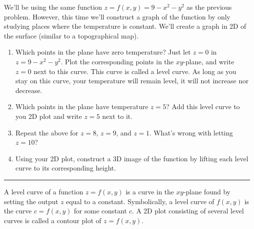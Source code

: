 \begin{problem}\label{cake level curves plot}%
%
 We'll be using the same function $z=f(x,y)=9-x^2-y^2$ as the previous problem.  However, this time we'll construct a graph of the function by only studying places where the temperature is constant.  We'll create a graph in 2D of the surface (similar to a topographical map). 
 \begin{enumerate}
  \item%
%
Which points in the plane have zero temperature? Just let $z=0$ in $z=9-x^2-y^2$. Plot the corresponding points in the $xy$-plane, and write $z=0$ next to this curve. This curve is called a level curve. As long as you stay on this curve, your temperature will remain level, it will not increase nor decrease. 
  \item Which points in the plane have temperature $z=5$?  Add this level curve to you 2D plot and write $z=5$ next to it.
  \item Repeat the above for $z=8$, $z=9$, and $z=1$. What's wrong with letting $z=10$? 
  \item Using your 2D plot, construct a 3D image of the function by lifting each level curve to its corresponding height.
 \end{enumerate}
\hrule\end{problem}

\begin{definition}
 A level curve of a function $z=f(x,y)$ is a curve in the $xy$-plane found by setting the output $z$ equal to a constant. Symbolically, a level curve of $f(x,y)$ is the curve $c=f(x,y)$ for some constant $c$.  A 2D plot consisting of several level curves is called a contour plot of $z=f(x,y)$.
\end{definition}

